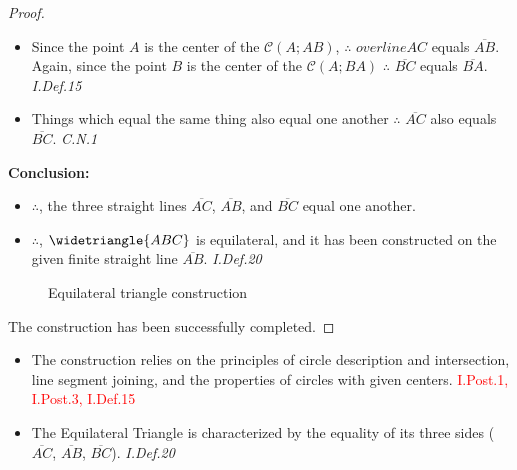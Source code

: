 \begin{proof}
 
  \begin{itemize}
  \item Since the point $A$ is the center of the $\mathscr{C}(A;AB)$, $\therefore$ $overline{AC}$ equals $\overline{AB}$. Again, since the point $B$ is the center of the $\mathscr{C}(A;BA)$ $\therefore$ $\overline{BC}$ equals $\overline{BA}$.  \hfill\textit{ I.Def.15}
  \item Things which equal the same thing also equal one another $\therefore$ $\overline{AC}$ also equals$\overline{BC}$. 
              \hfill\textit{ C.N.1}
\end{itemize}

\clearpage

\textbf{Conclusion:}

\begin{itemize}
	\item $\therefore$,  the three straight lines $\overline{AC}$, $\overline{AB}$, and $\overline{BC}$ equal one another.
  	\item $\therefore$,  $\widetriangle{ABC}$ is equilateral,  and it has been constructed on the given finite straight line $\overline{AB}$. \hfill\textit{ I.Def.20}
\end{itemize}

\begin{figure}[h]
		\caption{Equilateral triangle construction}
\end{figure}

 The construction has been successfully completed. 
\end{proof}

	\begin{itemize}
		\item The construction relies on the principles of circle description and intersection, line segment joining, and the properties of circles with given centers. \hfill\textcolor{red}{ I.Post.1, I.Post.3, I.Def.15}
    		\item The Equilateral Triangle is characterized by the equality of its three sides ($\overline{AC}$, $\overline{AB}$, $\overline{BC}$).\hfill\textit{ I.Def.20}
	\end{itemize}

\clearpage

